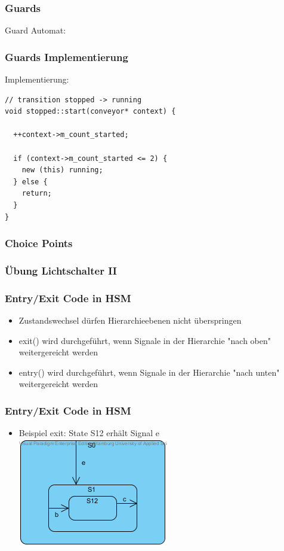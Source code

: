 \documentclass{beamer}
\begin{document}
\begin{frame}
 \frametitle{Guards}
 Guard Automat:
\end{frame}

\begin{frame}[fragile]
 \frametitle{Guards Implementierung}
 Implementierung:
 \begin{lstlisting}
// transition stopped -> running
void stopped::start(conveyor* context) {

  ++context->m_count_started;

  if (context->m_count_started <= 2) {
    new (this) running;
  } else {
    return;
  }
}
 \end{lstlisting}
\end{frame}

\begin{frame}
 \frametitle{Choice Points}
\end{frame}

\begin{frame}
 \frametitle{\"Ubung Lichtschalter II}
\end{frame}

\begin{frame}
 \frametitle{Entry/Exit Code in HSM }
 \begin{itemize}
  \item Zustandswechsel d\"urfen Hierarchieebenen nicht \"uberspringen
  \item exit() wird durchgef\"uhrt, wenn Signale in der Hierarchie "nach oben" weitergereicht werden
  \item entry() wird  durchgef\"uhrt, wenn Signale in der Hierarchie "nach unten" weitergereicht werden
 \end{itemize}
\end{frame}

\begin{frame}
 \frametitle{Entry/Exit Code in HSM }
 \begin{itemize}
  \item Beispiel exit: State S12 erh\"alt Signal e\newline\newline
  \includegraphics[scale=.6]{img/beispiel_exitSM}
 \end{itemize}
\end{frame}
\end{document}
